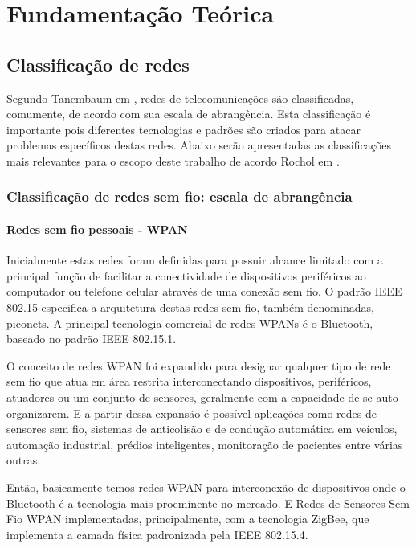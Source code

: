 \chapter{Fundamentação Teórica}
\label{fundamentacao}

\section{Classificação de redes}
\label{classRedes}
Segundo Tanembaum em \cite{tanembaum2011}, redes de telecomunicações são classificadas, comumente, de acordo com sua escala de abrangência. Esta classificação é importante pois diferentes tecnologias e padrões são criados para atacar problemas específicos destas redes. Abaixo serão apresentadas as classificações mais relevantes para o escopo deste trabalho de acordo Rochol em \cite{rochol2018sistemas}.


\subsection{Classificação de redes sem fio: escala de abrangência}
\subsubsection*{Redes sem fio pessoais - WPAN}
Inicialmente estas redes foram definidas para possuir alcance limitado com a principal função de facilitar a conectividade de dispositivos periféricos ao computador ou telefone celular através de uma conexão sem fio. O padrão IEEE 802.15 especifica a arquitetura destas redes sem fio, também denominadas, piconets. A principal  tecnologia comercial de redes WPANs é o Bluetooth, baseado no padrão IEEE 802.15.1.

O conceito de redes WPAN foi expandido para designar qualquer tipo de rede sem fio que atua em área restrita interconectando dispositivos, periféricos, atuadores ou um conjunto de sensores, geralmente com a capacidade de se auto-organizarem. E a partir dessa expansão é possível aplicações como redes de sensores sem fio, sistemas de anticolisão e de condução automática em veículos, automação industrial, prédios inteligentes, monitoração de pacientes entre várias outras.

Então, basicamente temos redes WPAN para interconexão de dispositivos onde o Bluetooth é a tecnologia mais proeminente no mercado. E Redes de Sensores Sem Fio WPAN implementadas, principalmente, com a tecnologia ZigBee, que implementa a camada física padronizada pela IEEE 802.15.4.


